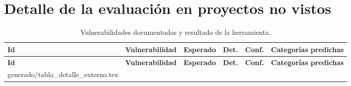 \documentclass[12pt,a4paper]{article}
\makeatletter
\newcommand{\tabla}[1]{\@@input generado/#1 }
\makeatother
\begin{document}
\section{Detalle de la evaluación en proyectos no vistos}
{\footnotesize
\begin{longtable}{@{}lP{5.6cm}P{2.3cm}cP{0.7cm}P{2.4cm}@{}}
\caption{Vulnerabilidades documentadas y resultado de la herramienta.}\label{tab:detalle}\\
\toprule
\textbf{Id} & \textbf{Vulnerabilidad} & \textbf{Esperado} & \textbf{Det.} & \textbf{Conf.} & \textbf{Categorías predichas}\\
\midrule
\endfirsthead
\toprule
\textbf{Id} & \textbf{Vulnerabilidad} & \textbf{Esperado} & \textbf{Det.} & \textbf{Conf.} & \textbf{Categorías predichas}\\
\midrule
\endhead
\tabla{tabla_detalle_externo.tex}
\bottomrule
\end{longtable}
}
\end{document}
